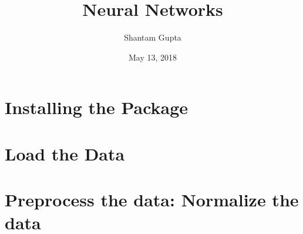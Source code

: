\documentclass[]{article}
\title{Neural Networks}
\author{Shantam Gupta}
\date{May 13, 2018}
\begin{document}
\maketitle

{
\setcounter{tocdepth}{2}
\tableofcontents
}
\section{Installing the Package}\label{installing-the-package}

\section{Load the Data}\label{load-the-data}

\section{Preprocess the data: Normalize the
data}\label{preprocess-the-data-normalize-the-data}
\end{document}

